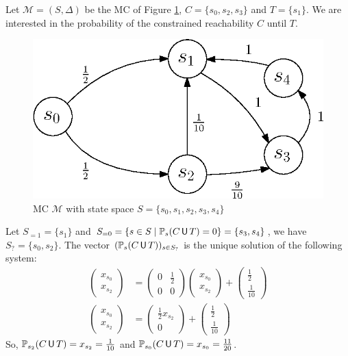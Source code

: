 \begin{example} \label{constrained-reach-example}
Let $\mathcal{M}=(S, \Delta)$ be the MC of Figure \ref{CUTexample},
 $C = \{s_0, s_2, s_3\}$ and $T = \{s_1\}$. We are interested in the probability of the constrained reachability $C$ until $T$.
  \begin{figure}[H]
    \centering
    \includegraphics[width=0.4\linewidth]{resources/CUTexample}
    \captionsetup{justification=centering}
    \caption{MC $\mathcal{M}$ with state space $S = \{s_0, s_1, s_2, s_3, s_4\}$}\label{CUTexample}
  \end{figure}
  Let $S_{=1} = \{s_1\}$ and $S_{=0} = \{s \in S \; | \; \mathbb{P}_{s}(C\,\text{\sffamily U}\, T)=0\} = \{s_3, s_4\}$, we have $S_{?} = \{s_0, s_2\}$.
  The vector $(\mathbb{P}_{s}(C \,\text{\sffamily U}\, T))_{s \in S_?}$ is the unique solution of the following system:
  \begin{align*}
  	\begin{pmatrix}
      x_{s_0}\\[0.3em]
      x_{s_2}
  	\end{pmatrix} &=
    \begin{pmatrix}
      0 & \frac{1}{2} \\[0.3em]
      0 & 0
    \end{pmatrix}
    \begin{pmatrix}
      x_{s_0}\\[0.3em]
      x_{s_2}
    \end{pmatrix}
    +
    \begin{pmatrix}
      \frac{1}{2}\\[0.3em]
      \frac{1}{10}
    \end{pmatrix} \\
    \begin{pmatrix}
      x_{s_0}\\[0.3em]
      x_{s_2}
  	\end{pmatrix} &=
    \begin{pmatrix}
      \frac{1}{2} x_{s_2} \\[0.3em]
      0
    \end{pmatrix}
    +
    \begin{pmatrix}
      \frac{1}{2}\\[0.3em]
      \frac{1}{10}
    \end{pmatrix}
  \end{align*}
  So, $\mathbb{P}_{s_2}(C \,\text{\sffamily U}\, T) = x_{s_2} = \frac{1}{10}$ and $\mathbb{P}_{s_0}(C \,\text{\sffamily U}\, T) = x_{s_0} = \frac{11}{20}$.
  \\
\end{example}

